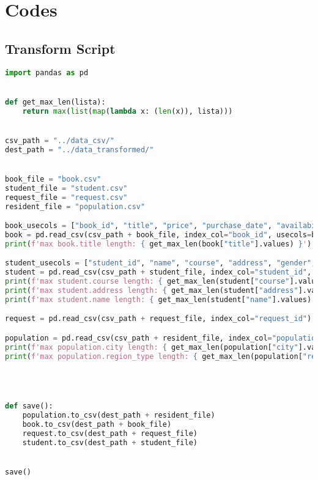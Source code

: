 \chapter{Codes}
\label{appendix:codes}

\section{Transform Script}
\label{appendix:transform_script}

\begin{lstlisting}[language=python, caption={Transform script}, label={lst:transform_script}]
import pandas as pd


def get_max_len(lista):
    return max(list(map(lambda x: (len(x)), lista)))


csv_path = "../data_csv/"
dest_path = "../data_transformed/"


book_file = "book.csv"
student_file = "student.csv"
request_file = "request.csv"
resident_file = "population.csv"

book_usecols = ["book_id", "title", "price", "purchase_date", "availability"]
book = pd.read_csv(csv_path + book_file, index_col="book_id", usecols=book_usecols)
print(f'max book.title length: { get_max_len(book["title"].values) }')

student_usecols = ["student_id", "name", "course", "address", "gender", "date_of_birth"]
student = pd.read_csv(csv_path + student_file, index_col="student_id", usecols=student_usecols)
print(f'max student.course length: { get_max_len(student["course"].values) }')
print(f'max student.address length: { get_max_len(student["address"].values) }\n')
print(f'max student.name length: { get_max_len(student["name"].values) }\n')

request = pd.read_csv(csv_path + request_file, index_col="request_id")

population = pd.read_csv(csv_path + resident_file, index_col="population_id")
print(f'max population.city length: { get_max_len(population["city"].values) }')
print(f'max population.region_type length: { get_max_len(population["region_type"].values) }')




def save():
    population.to_csv(dest_path + resident_file)
    book.to_csv(dest_path + book_file)
    request.to_csv(dest_path + request_file)
    student.to_csv(dest_path + student_file)


save()
\end{lstlisting}

